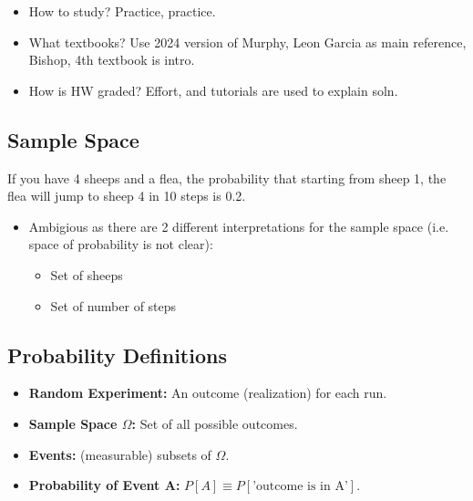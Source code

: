 \begin{summary}

\end{summary}

\begin{faq}
    \begin{itemize}
        \item How to study? Practice, practice.
        \item What textbooks? Use 2024 version of Murphy, Leon Garcia as main reference, Bishop, 4th textbook is intro.
        \item How is HW graded? Effort, and tutorials are used to explain soln. 
    \end{itemize}
\end{faq}

\subsection{Sample Space}
\begin{motivation}
    If you have 4 sheeps and a flea, the probability that starting from sheep 1, the flea will jump to sheep 4 in 10 steps is 0.2.
    \begin{itemize}
        \item Ambigious as there are 2 different interpretations for the sample space (i.e. space of probability is not clear):
        \begin{itemize}
            \item Set of sheeps
            \item Set of number of steps
        \end{itemize}
    \end{itemize}
\end{motivation}

\subsection{Probability Definitions}
\begin{definition}
    \begin{itemize}
        \item \textbf{Random Experiment:} An outcome (realization) for each run. 
        \item \textbf{Sample Space $\Omega$:} Set of all possible outcomes.
        \item \textbf{Events:} (measurable) subsets of $\Omega$.
        \item \textbf{Probability of Event A:} $P[A] \equiv P[\text{'outcome is in A'}]$.
    \end{itemize}
\end{definition}

